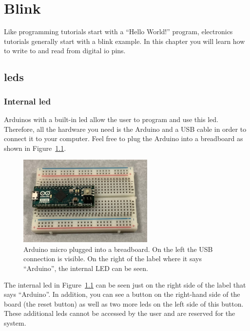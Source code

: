 
\chapter{Blink}

Like programming tutorials start with a ``Hello World!'' program, electronics tutorials generally start with a blink example. In this chapter you will learn how to write to and read from digital \ac{io} pins. 

\section{\Acp{led}}

\subsection{Internal \ac{led}}

Arduinos with a built-in \ac{led} allow the user to program and use this \ac{led}. Therefore, all the hardware you need is the Arduino and a USB cable in order to connect it to your computer. Feel free to plug the Arduino into a breadboard as shown in Figure~\ref{fig:blink:arduino_alone}.
\begin{figure}[htb]
    \centering
    \includegraphics[width=0.6\textwidth]{graphics/01_blink/arduino_alone.jpg}
    \caption{Arduino micro plugged into a breadboard. On the left the USB connection is visible. On the right of the label where it says ``Arduino'', the internal LED can be seen.}
    \label{fig:blink:arduino_alone}
\end{figure}
The internal \ac{led} in Figure~\ref{fig:blink:arduino_alone} can be seen just on the right side of the label that says ``Arduino''. In addition, you can see a button on the right-hand side of the board (the reset button) as well as two more \acp{led} on the left side of this button. These additional \acp{led} cannot be accessed by the user and are reserved for the system.

